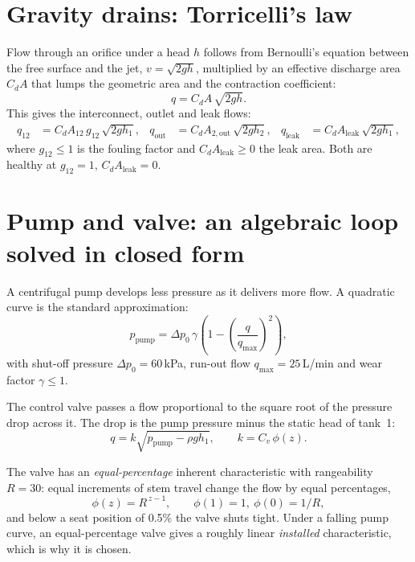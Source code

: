 \section{Gravity drains: Torricelli's law}

Flow through an orifice under a head $h$ follows from Bernoulli's equation
between the free surface and the jet, $v=\sqrt{2gh}$, multiplied by an
effective discharge area $C_dA$ that lumps the geometric area and the
contraction coefficient:
\begin{equation}
  q = C_dA\,\sqrt{2gh}.
\end{equation}
This gives the interconnect, outlet and leak flows:
\begin{align}
  q_{12} &= C_dA_{12}\,g_{12}\,\sqrt{2gh_1}, &
  q_\text{out} &= C_dA_{2,\text{out}}\,\sqrt{2gh_2}, &
  q_\text{leak} &= C_dA_\text{leak}\,\sqrt{2gh_1},
\end{align}
where $g_{12}\le1$ is the fouling factor and $C_dA_\text{leak}\ge0$ the leak
area. Both are healthy at $g_{12}=1$, $C_dA_\text{leak}=0$.

\section{Pump and valve: an algebraic loop solved in closed form}

A centrifugal pump develops less pressure as it delivers more flow. A
quadratic curve is the standard approximation:
\begin{equation}
  p_\text{pump} = \Delta p_0\,\gamma\left(1-\left(\frac{q}{q_\text{max}}\right)^2\right),
\end{equation}
with shut-off pressure $\Delta p_0 = 60$\,kPa, run-out flow
$q_\text{max} = 25$\,L/min and wear factor $\gamma\le1$.

The control valve passes a flow proportional to the square root of the
pressure drop across it. The drop is the pump pressure minus the static head
of tank~1:
\begin{equation}
  q = k\sqrt{p_\text{pump}-\rho g h_1}, \qquad k = C_v\,\phi(z).
\end{equation}

The valve has an \emph{equal-percentage} inherent characteristic with
rangeability $R=30$: equal increments of stem travel change the flow by equal
percentages,
\begin{equation}
  \phi(z) = R^{\,z-1}, \qquad \phi(1) = 1,\ \phi(0) = 1/R,
\end{equation}
and below a seat position of 0.5\% the valve shuts tight. Under a falling
pump curve, an equal-percentage valve gives a roughly linear
\emph{installed} characteristic, which is why it is chosen.

